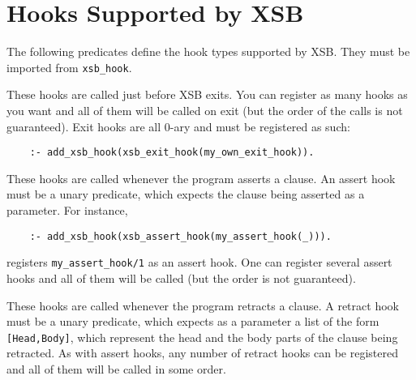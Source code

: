 \section{Hooks Supported by XSB}

The following predicates define the hook types supported by XSB. They must
be imported from {\tt xsb\_hook}.

\begin{description}

These hooks are called just before XSB exits. You can register as many
hooks as you want and all of them will be called on exit (but the order of
the calls is not guaranteed). Exit hooks are all 0-ary and must be registered
as such:
\begin{verbatim}
    :- add_xsb_hook(xsb_exit_hook(my_own_exit_hook)).
\end{verbatim}


%
These hooks are called whenever the program asserts a clause. An assert
hook must be a unary predicate, which expects the clause
being asserted as a parameter. For instance,
\begin{verbatim}
    :- add_xsb_hook(xsb_assert_hook(my_assert_hook(_))).
\end{verbatim}
registers {\tt my\_assert\_hook/1} as an assert hook. One can register
several assert hooks and all of them will be called (but the order is not
guaranteed).

%
These hooks are called whenever the program retracts a clause. A retract
hook must be a unary predicate, which expects as a parameter a list of the
form {\tt [Head,Body]}, which represent the head and the body parts of the
clause being retracted. As with assert hooks, any number of retract hooks
can be registered and all of them will be called in some order.

\end{description}


